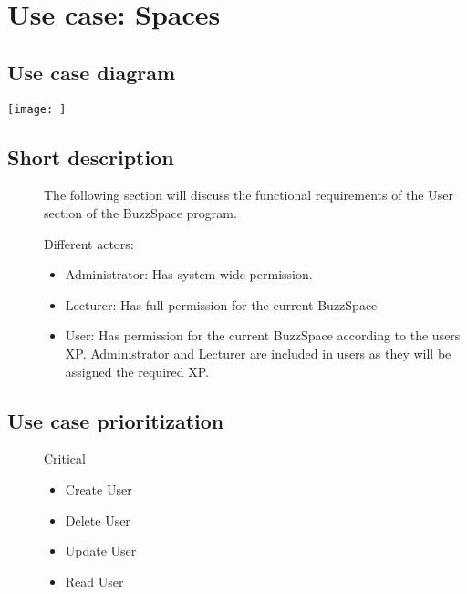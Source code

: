 \documentclass{article}
\begin{document}
\section{Use case: Spaces}
\subsection{Use case diagram}
\texttt{[image: ]}
\subsection{Short description}
\begin{description}
\item[]
The following section will discuss the functional requirements of the User section of the BuzzSpace program.
\item[] Different actors:
\begin{itemize}
\item Administrator: Has system wide permission.
\item Lecturer: Has full permission for the current BuzzSpace
\item User: Has permission for the current BuzzSpace according to the users XP. Administrator and Lecturer are included in users as they will be assigned the required XP.
\end{itemize}
\end{description}
\subsection{Use case prioritization}
\begin{description}
\item[] Critical
\begin{itemize}
\item Create User
\item Delete User
\item Update User
\item Read User
\end{itemize}

\end{description}
\end{document}
